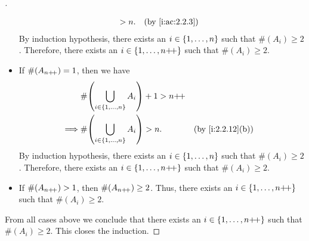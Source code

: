 \begin{proof}[]
\begin{itemize}
\begin{align*}
                                                            & > n.                                           &  & \by{i:ac:2.2.3}
          \end{align*}
          By induction hypothesis, there exists an \(i \in \left\lbrace1, \dots, n\right\rbrace\) such that \(\#(A_i) \geq 2\).
          Therefore, there exists an \(i \in \left\lbrace1, \dots, n{+}\!{+}\right\rbrace\) such that \(\#(A_i) \geq 2\).
    \item If \(\#(A_{n{+}\!{+}}) = 1\), then we have
          \begin{align*}
                     & \#\pa{\bigcup_{i \in \set{1, \dots, n}} A_i} + 1 > n\pp                       \\
            \implies & \#\pa{\bigcup_{i \in \set{1, \dots, n}} A_i} > n.       &  & \by{i:2.2.12}[b]
          \end{align*}
          By induction hypothesis, there exists an \(i \in \left\lbrace1, \dots, n\right\rbrace\) such that \(\#(A_i) \geq 2\).
          Therefore, there exists an \(i \in \left\lbrace1, \dots, n{+}\!{+}\right\rbrace\) such that \(\#(A_i) \geq 2\).
    \item If \(\#(A_{n{+}\!{+}}) > 1\), then \(\#(A_{n{+}\!{+}}) \geq 2\).
          Thus, there exists an \(i \in \left\lbrace1, \dots, n{+}\!{+}\right\rbrace\) such that \(\#(A_i) \geq 2\).
  \end{itemize}
  From all cases above we conclude that there exists an \(i \in \left\lbrace1, \dots, n{+}\!{+}\right\rbrace\) such that \(\#(A_i) \geq 2\).
  This closes the induction.
\end{proof}
